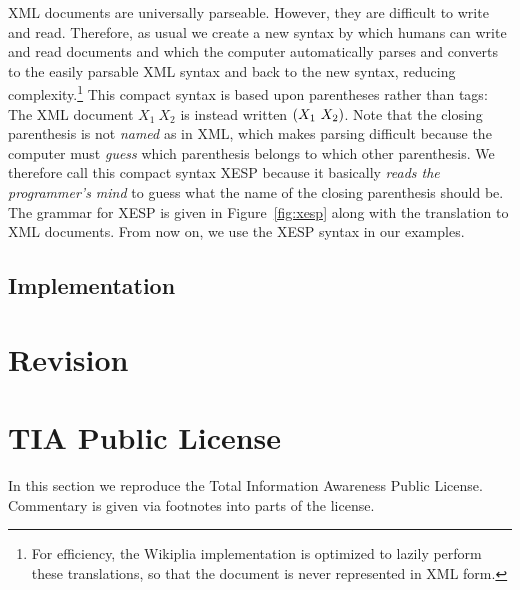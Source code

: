 \documentclass[twocolumn]{article}
\begin{document}
XML documents are universally parseable.\z{} However,
they are difficult to write and read. Therefore, as usual we create a new syntax by which humans can write and read
documents and which the computer automatically parses and converts to
the easily parsable XML syntax and back to the new syntax, reducing
complexity.\z\footnote{For efficiency, the Wikiplia implementation is
optimized to lazily perform these translations, so that the document
is never represented in XML form.} This compact syntax is based upon
parentheses rather than tags: The XML document $\tag{list}{X_1\ X_2}$
is instead written ${\tt(}X_1\ X_2{\tt)}$. Note that the closing
parenthesis is not {\em named} as in XML, which makes parsing
difficult because the computer must {\em guess} which parenthesis
belongs to which other parenthesis. We therefore call this compact
syntax XESP because it basically {\em reads the programmer's
mind} to guess what the name of the
closing parenthesis should be. The grammar for XESP is given in
Figure~\ref{fig:xesp} along with the translation to XML documents.
From now on, we use the XESP syntax in our examples.

\subsection{Implementation}

\section{Revision \currentrevision} \label{sec:current}

\section{TIA Public License} \label{sec:license}

In this section we reproduce the Total Information Awareness Public
License. Commentary is given via footnotes into parts
of the license.
\end{document}
